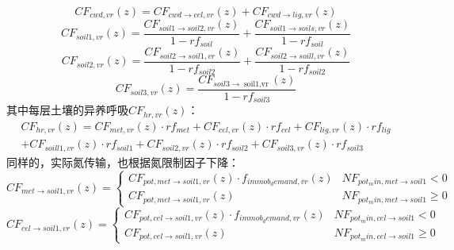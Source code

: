 \begin{equation}
C F_{c w d, vr}(z)=C F_{c w d \rightarrow cel, vr}(z)+C F_{c w d \rightarrow lig, vr}(z)
\end{equation}
\begin{equation}
C F_{{soil } 1, vr}(z)=\frac{C F_{{soil1 } \rightarrow { soil } 2, vr}(z)}{1-r f_{{soil }}}+\frac{C F_{{soil } 1 \rightarrow { soils,vr }}(z)}{1-r f_{{soil }}}
\end{equation}
\begin{equation}
C F_{{soil2,vr }}(z)=\frac{C F_{{soil2 } \rightarrow { soil1,vr }}(z)}{1-r f_{{soil2 }}}+\frac{C F_{{soil2 } \rightarrow { soill,vr }}(z)}{1-r f_{{soil2 }}}
\end{equation}
\begin{equation}
C F_{{soil3,vr }}(z)=\frac{C F_{{soil } 3 \rightarrow \operatorname{soil1,vr}}(z)}{1-r f_{{soil3 }}}
\end{equation}
其中每层土壤的异养呼吸$CF_{hr,vr}\left(z\right)$：
\begin{equation}
\begin{array}{l}C F_{h r, vr}(z)=C F_{met, vr}(z) \cdot r f_{met}+C F_{cel, vr}(z) \cdot r f_{cel}+C F_{lig, vr}(z) \cdot r f_{lig} \\ +C F_{{soill } 1, vr}(z) \cdot r f_{{soil1 }}+C F_{{soil2,vr }}(z) \cdot r f_{{soil2 }}+C F_{{soil3,vr }}(z) \cdot r f_{{soil3 }}\end{array}
\end{equation}
同样的，实际氮传输，也根据氮限制因子下降：
\begin{equation}
    C F_{met \rightarrow soil1, vr}(z)=\left\{\begin{array}{ll}C F_{pot, met \rightarrow soil1, vr}(z) \cdot f_{i m m o b_{d} e m a n d, vr}(z) & N F_{pot_{m} i n, met \rightarrow soil1}<0 \\ C F_{pot, met \rightarrow soil1, vr}(z) & N F_{pot_{m} i n, met \rightarrow soil1} \geq 0\end{array}\right.
\end{equation}
\begin{equation}
    C F_{cel \rightarrow soil1, vr}(z)=\left\{\begin{array}{ll}C F_{pot, cel \rightarrow soil1, vr}(z) \cdot f_{i m m o b_{d} e m a n d, vr}(z) & N F_{pot_{m} i n, cel \rightarrow soil1}<0 \\ C F_{pot, cel \rightarrow soil1, vr}(z) & N F_{pot_{m} i n, cel \rightarrow soil1} \geq 0\end{array}\right.
\end{equation}
